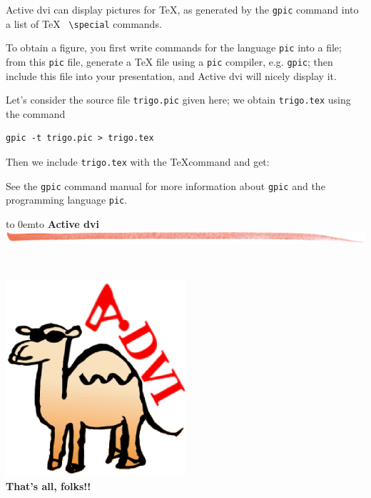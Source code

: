 \documentclass[12pt]{article}
\def\keymenu#1{\textcolor{red}{\underline{#1}}}
\def\advifooter{\vbox to 0em{\vbox to \vsize {\vfill
Press: \keymenu{n}ext page \keymenu{p}revious page
\keymenu{\textvisiblespace} next pause%
\hfill{\embedsticky{advianim}{1.56cm}{1.824cm}{animate -geometry !g! -window !p advilogo.anim.gif}}
} \vss}}
\def\adviheader{\noindent
{\bf\Large Active dvi}\\
\includegraphics[width=\textwidth]{../tex/bar.jpg.eps}}
\let \Newpage \newpage
\def \newpage {\Newpage \advifooter\adviheader}
\def\adviemptyfooter{\vbox to 0em{\vbox to \vsize {\vfill
~~\vss\killembed{advianim}}}}
\def\lastpage{\Newpage\adviemptyfooter\adviheader}
\begin{document}
Active dvi can display pictures for \TeX, as generated by
the \verb"gpic" command into a list of \TeX~ \verb"\special" commands.

\bigskip

To obtain a figure, you first write commands for the language
\verb"pic" into a file; from this \verb"pic" file, generate a \TeX
file using a \verb"pic" compiler, e.g. \verb"gpic"; then include this
file into your presentation, and Active dvi will nicely display it.

Let's consider the source file \verb"trigo.pic" given here; we obtain
\verb"trigo.tex" using the command 
\begin{verbatim}
gpic -t trigo.pic > trigo.tex
\end{verbatim}

Then we include \verb"trigo.tex" with the \TeX command
\verb|| and get:

\def\showgraph{%
  \par\medskip\centerline{\raise 1em\box\graph}\bigskip\noindent\ignorespaces}



See the \verb"gpic" command manual for more information about
\verb"gpic" and the programming language \verb"pic".

\lastpage

~\vfill
\begin{center}
\includegraphics[width=0.5\textwidth]{../tex/advilogo.eps}\\
{\Large \bf That's all, folks!!}
\end{center}
\vfill
\end{document}
